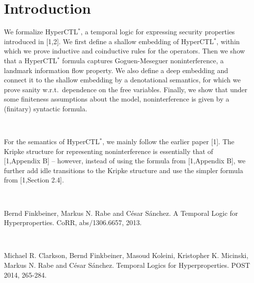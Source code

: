 
\section{Introduction}

 
We formalize HyperCTL$^*$, a temporal logic for expressing security properties 
introduced in [1,2].  
We first define a shallow embedding of HyperCTL$^*$, within which we prove 
inductive and coinductive rules for the operators.  
Then we show that a HyperCTL$^*$ formula captures Goguen-Meseguer noninterference, a landmark 
information flow property.  
We also define a deep embedding and connect it to the shallow embedding 
by a denotational semantics, for which we prove sanity w.r.t.\ 
dependence on the free variables.  Finally, we show that under some finiteness assumptions 
about the model, 
noninterference is given by a (finitary) syntactic formula.

\par \ \par
For the semantics of HyperCTL$^*$, we mainly follow the earlier paper [1].  
The Kripke structure for representing noninterference is essentially that of [1,Appendix B] -- 
however, instead of using the formula from [1,Appendix B], we further add 
idle transitions to the Kripke structure and use the simpler formula from [1,Section 2.4].  


\par \ \par
[1] Bernd Finkbeiner, Markus N. Rabe and C\'{e}sar S\'{a}nchez.  
A Temporal Logic for Hyperproperties. CoRR, abs$/$1306.6657, 2013.

\par \ \par
[2] Michael R. Clarkson, Bernd Finkbeiner, Masoud Koleini, Kristopher K. Micinski, 
Markus N. Rabe and C\'{e}sar S\'{a}nchez. 
Temporal Logics for Hyperproperties. POST 2014, 265-284.  


